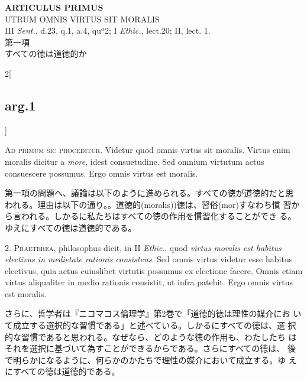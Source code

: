 \documentclass[paper=a4paper,fontsize=10pt,jafontsize=9pt,titlepage]{jlreq}
\begin{document}
\begin{center}
{\Large {\bfseries ARTICULUS PRIMUS}}\\
{\large UTRUM OMNIS VIRTUS SIT MORALIS}\\
{\footnotesize III {\itshape Sent.}, d.23, q.1, a.4, qu$^{a}$2; I {\itshape Ethic.}, lect.20; II, lect. 1.}\\
{\Large 第一項\\すべての徳は道徳的か}
\end{center}

\begin{paracol}{2}[\subsection{arg.1}]

{\scshape Ad primum sic proceditur}. Videtur quod omnis virtus sit
moralis. Virtus enim moralis dicitur a {\itshape more}, idest
consuetudine. Sed omnium virtutum actus consuescere possumus. Ergo
omnis virtus est moralis.

\switchcolumn

第一項の問題へ、議論は以下のように進められる。すべての徳が道徳的だと思
われる。理由は以下の通り。。道徳的(moralis))徳は、習俗(mor)すなわち慣
習から言われる。しかるに私たちはすべての徳の作用を慣習化することができ
る。ゆえにすべての徳は道徳的である。


2. {\scshape Praeterea}, philosophus dicit, in II {\itshape Ethic}.,
quod {\itshape virtus moralis est habitus electivus in medietate rationis
consistens}. Sed omnis virtus videtur esse habitus electivus, quia
actus cuiuslibet virtutis possumus ex electione facere. Omnis etiam
virtus aliqualiter in medio rationis consistit, ut infra patebit. Ergo
omnis virtus est moralis.

\switchcolumn

さらに、哲学者は『ニコマコス倫理学』第2巻で「道徳的徳は理性の媒介にお
いて成立する選択的な習慣である」と述べている。しかるにすべての徳は、選
択的な習慣であると思われる。なぜなら、どのような徳の作用も、わたしたち
はそれを選択に基づいて為すことができるからである。さらにすべての徳は、
後で明らかになるように、何らかのかたちで理性の媒介において成立する。ゆ
えにすべての徳は道徳的である。



\end{paracol}
\end{document}
